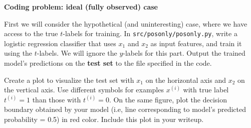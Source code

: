 \item {} \textbf{Coding problem: ideal (fully observed) case}

First we will consider the hypothetical (and uninteresting) case, where we have access to the true
$t$-labels for training. In \texttt{src/posonly/posonly.py}, write a logistic
regression classifier that uses $x_1$ and $x_2$ as input features, and train it
using the $t$-labels. We will ignore the $y$-labels for this part. Output the
trained model's predictions on the \textbf{test set} to the file specified in the code.

Create a plot to visualize the test set with $x_1$ on the horizontal axis and $x_2$ on
the vertical axis. Use different symbols for examples $x^{(i)}$ with true label $t^{(i)} = 1$
than those with $t^{(i)} = 0$. On the same figure, plot the decision boundary obtained
by your model (i.e, line corresponding to model's predicted probability = 0.5) in red color. Include
this plot in your writeup.


